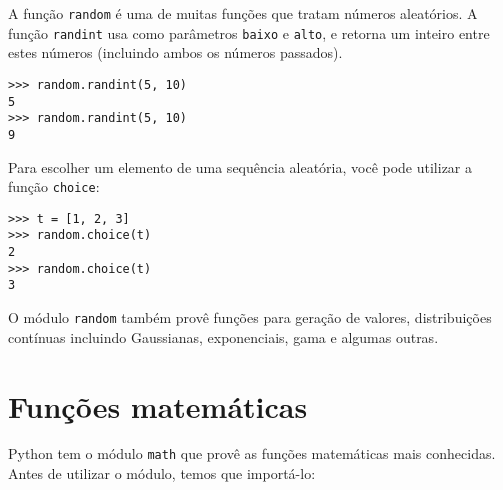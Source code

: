 
A função {\tt random} é uma de muitas funções que tratam números aleatórios.
A função {\tt randint} usa como parâmetros {\tt baixo} e {\tt alto}, e retorna
um inteiro entre estes números (incluindo ambos os números passados).


\beforeverb
\begin{verbatim}
>>> random.randint(5, 10)
5
>>> random.randint(5, 10)
9
\end{verbatim}
\afterverb
%

Para escolher um elemento de uma sequência aleatória, você pode utilizar a
função {\tt choice}:


\beforeverb
\begin{verbatim}
>>> t = [1, 2, 3]
>>> random.choice(t)
2
>>> random.choice(t)
3
\end{verbatim}
\afterverb
%
%
O módulo {\tt random} também provê funções para geração de valores,
distribuições contínuas incluindo Gaussianas, exponenciais, gama e algumas
outras.

\section{Funções matemáticas}



Python tem o módulo {\tt math} que provê as funções matemáticas mais
conhecidas. Antes de utilizar o módulo, temos que importá-lo:

